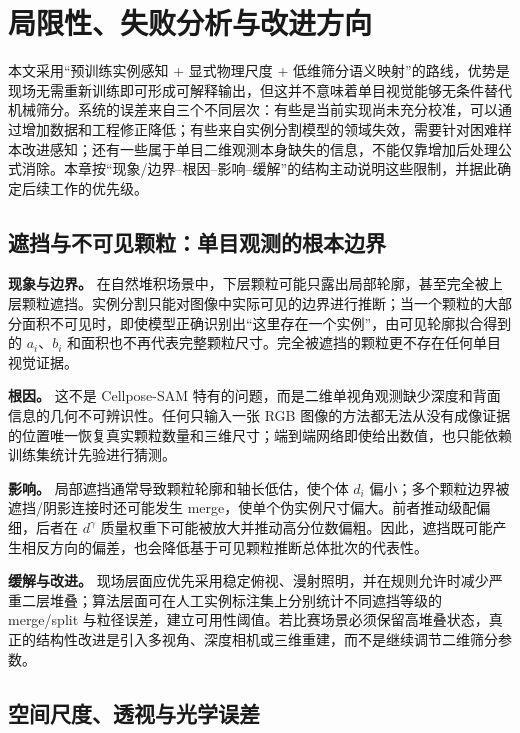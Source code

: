 \section{局限性、失败分析与改进方向}
\label{sec:limitations}

本文采用“预训练实例感知 + 显式物理尺度 + 低维筛分语义映射”的路线，优势是现场无需重新训练即可形成可解释输出，但这并不意味着单目视觉能够无条件替代机械筛分。系统的误差来自三个不同层次：有些是当前实现尚未充分校准，可以通过增加数据和工程修正降低；有些来自实例分割模型的领域失效，需要针对困难样本改进感知；还有一些属于单目二维观测本身缺失的信息，不能仅靠增加后处理公式消除。本章按“现象/边界--根因--影响--缓解”的结构主动说明这些限制，并据此确定后续工作的优先级。

\subsection{遮挡与不可见颗粒：单目观测的根本边界}
\label{sec:limit-occlusion}

\textbf{现象与边界。} 在自然堆积场景中，下层颗粒可能只露出局部轮廓，甚至完全被上层颗粒遮挡。实例分割只能对图像中实际可见的边界进行推断；当一个颗粒的大部分面积不可见时，即使模型正确识别出“这里存在一个实例”，由可见轮廓拟合得到的 $a_i$、$b_i$ 和面积也不再代表完整颗粒尺寸。完全被遮挡的颗粒更不存在任何单目视觉证据。

\textbf{根因。} 这不是 Cellpose-SAM 特有的问题，而是二维单视角观测缺少深度和背面信息的几何不可辨识性。任何只输入一张 RGB 图像的方法都无法从没有成像证据的位置唯一恢复真实颗粒数量和三维尺寸；端到端网络即使给出数值，也只能依赖训练集统计先验进行猜测。

\textbf{影响。} 局部遮挡通常导致颗粒轮廓和轴长低估，使个体 $d_i$ 偏小；多个颗粒边界被遮挡/阴影连接时还可能发生 merge，使单个伪实例尺寸偏大。前者推动级配偏细，后者在 $d^\gamma$ 质量权重下可能被放大并推动高分位数偏粗。因此，遮挡既可能产生相反方向的偏差，也会降低基于可见颗粒推断总体批次的代表性。

\textbf{缓解与改进。} 现场层面应优先采用稳定俯视、漫射照明，并在规则允许时减少严重二层堆叠；算法层面可在人工实例标注集上分别统计不同遮挡等级的 merge/split 与粒径误差，建立可用性阈值。若比赛场景必须保留高堆叠状态，真正的结构性改进是引入多视角、深度相机或三维重建，而不是继续调节二维筛分参数。

\subsection{空间尺度、透视与光学误差}
\label{sec:limit-scale}

